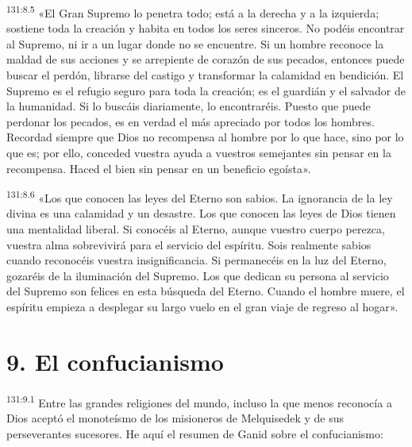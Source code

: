 \par 
\textsuperscript{131:8.5} «El Gran Supremo lo penetra todo; está a la derecha y a la izquierda; sostiene toda la creación y habita en todos los seres sinceros. No podéis encontrar al Supremo, ni ir a un lugar donde no se encuentre. Si un hombre reconoce la maldad de sus acciones y se arrepiente de corazón de sus pecados, entonces puede buscar el perdón, librarse del castigo y transformar la calamidad en bendición. El Supremo es el refugio seguro para toda la creación; es el guardián y el salvador de la humanidad. Si lo buscáis diariamente, lo encontraréis. Puesto que puede perdonar los pecados, es en verdad el más apreciado por todos los hombres. Recordad siempre que Dios no recompensa al hombre por lo que hace, sino por lo que es; por ello, conceded vuestra ayuda a vuestros semejantes sin pensar en la recompensa. Haced el bien sin pensar en un beneficio egoísta».

\par 
\textsuperscript{131:8.6} «Los que conocen las leyes del Eterno son sabios. La ignorancia de la ley divina es una calamidad y un desastre. Los que conocen las leyes de Dios tienen una mentalidad liberal. Si conocéis al Eterno, aunque vuestro cuerpo perezca, vuestra alma sobrevivirá para el servicio del espíritu. Sois realmente sabios cuando reconocéis vuestra insignificancia. Si permanecéis en la luz del Eterno, gozaréis de la iluminación del Supremo. Los que dedican su persona al servicio del Supremo son felices en esta búsqueda del Eterno. Cuando el hombre muere, el espíritu empieza a desplegar su largo vuelo en el gran viaje de regreso al hogar».

\section*{9. El confucianismo}
\par 
\textsuperscript{131:9.1} Entre las grandes religiones del mundo, incluso la que menos reconocía a Dios aceptó el monoteísmo de los misioneros de Melquisedek y de sus perseverantes sucesores. He aquí el resumen de Ganid sobre el confucianismo:

